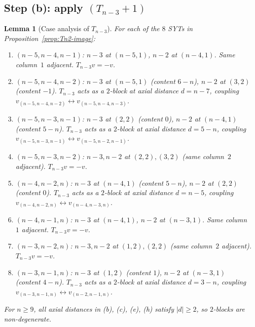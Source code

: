 \documentclass[11pt]{article}
\newtheorem{lemma}[theorem]{Lemma}
\theoremstyle{definition}
\begin{document}
\subsection{Step (b): apply $(T_{n-3}{+}1)$}

\begin{lemma}[Case analysis of $T_{n-3}$]\label{lem:Tn3-cases}
For each of the $8$ SYTs in Proposition~\ref{prop:Tn2-image}:
\begin{enumerate}[leftmargin=2em,topsep=0.3em,itemsep=0.2em,
label=\textup{(\alph*)}]
\item $(n{-}5,n{-}4,n{-}1)$: $n-3$ at $(n-5,1)$, $n-2$ at $(n-4,1)$.
Same column~$1$ adjacent.  $T_{n-3}v=-v$.
\item $(n{-}5,n{-}4,n{-}2)$: $n-3$ at $(n-5,1)$ (content $6-n$),
$n-2$ at $(3,2)$ (content $-1$).  $T_{n-3}$ acts as a $2$-block at
axial distance $d=n-7$, coupling
$v_{(n-5,n-4,n-2)}\leftrightarrow v_{(n-5,n-4,n-3)}$.
\item $(n{-}5,n{-}3,n{-}1)$: $n-3$ at $(2,2)$ (content $0$),
$n-2$ at $(n-4,1)$ (content $5-n$).  $T_{n-3}$ acts as a $2$-block
at axial distance $d=5-n$, coupling
$v_{(n-5,n-3,n-1)}\leftrightarrow v_{(n-5,n-2,n-1)}$.
\item $(n{-}5,n{-}3,n{-}2)$: $n-3,n-2$ at $(2,2),(3,2)$ (same
column~$2$ adjacent).  $T_{n-3}v=-v$.
\item $(n{-}4,n{-}2,n)$: $n-3$ at $(n-4,1)$ (content $5-n$), $n-2$
at $(2,2)$ (content $0$).  $T_{n-3}$ acts as a $2$-block at axial
distance $d=n-5$, coupling
$v_{(n-4,n-2,n)}\leftrightarrow v_{(n-4,n-3,n)}$.
\item $(n{-}4,n{-}1,n)$: $n-3$ at $(n-4,1)$, $n-2$ at $(n-3,1)$.
Same column~$1$ adjacent.  $T_{n-3}v=-v$.
\item $(n{-}3,n{-}2,n)$: $n-3,n-2$ at $(1,2),(2,2)$ (same
column~$2$ adjacent).  $T_{n-3}v=-v$.
\item $(n{-}3,n{-}1,n)$: $n-3$ at $(1,2)$ (content $1$), $n-2$ at
$(n-3,1)$ (content $4-n$).  $T_{n-3}$ acts as a $2$-block at axial
distance $d=3-n$, coupling
$v_{(n-3,n-1,n)}\leftrightarrow v_{(n-2,n-1,n)}$.
\end{enumerate}
For $n\ge 9$, all axial distances in (b), (c), (e), (h) satisfy
$|d|\ge 2$, so $2$-blocks are non-degenerate.
\end{lemma}
\end{document}
